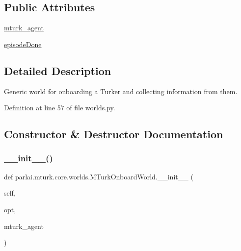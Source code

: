 \subsection*{Public Attributes}
\begin{DoxyCompactItemize}
\item 
\hyperlink{classparlai_1_1mturk_1_1core_1_1worlds_1_1MTurkOnboardWorld_a38d19c84f42e452f782df53df4fb9861}{mturk\+\_\+agent}
\item 
\hyperlink{classparlai_1_1mturk_1_1core_1_1worlds_1_1MTurkOnboardWorld_a025e27063d46523f471e2ac600592019}{episode\+Done}
\end{DoxyCompactItemize}


\subsection{Detailed Description}
\begin{DoxyVerb}Generic world for onboarding a Turker and collecting information from them.
\end{DoxyVerb}
 

Definition at line 57 of file worlds.\+py.



\subsection{Constructor \& Destructor Documentation}
\mbox{\label{classparlai_1_1mturk_1_1core_1_1worlds_1_1MTurkOnboardWorld_a6e38dd34f2894a74aa3d3d004e5be41f}} 
\subsubsection{\texorpdfstring{\+\_\+\+\_\+init\+\_\+\+\_\+()}{\_\_init\_\_()}}
{\footnotesize\ttfamily def parlai.\+mturk.\+core.\+worlds.\+M\+Turk\+Onboard\+World.\+\_\+\+\_\+init\+\_\+\+\_\+ (\begin{DoxyParamCaption}\item[{}]{self,  }\item[{}]{opt,  }\item[{}]{mturk\+\_\+agent }\end{DoxyParamCaption})}


